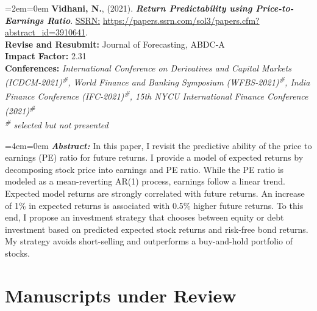 \documentclass[11pt,a4paper,]{moderncv}
\begin{document}
\begingroup
\setlength{\parindent}{-0.5in}
\setlength{\leftskip}{0.5in}

%
  \par%
  \medskip
  \leftskip=2em\rightskip=0em%
  \noindent\ignorespaces
\leavevmode\hypertarget{ref-pe}{}
\textbf{Vidhani, N.}, (2021). \textbf{\textit{Return Predictability using
Price-to-Earnings Ratio}}. \underline{SSRN:} \url{https://papers.ssrn.com/sol3/papers.cfm?abstract_id=3910641}.\\
\textbf{Revise and Resubmit:} Journal of Forecasting, ABDC-A\\
\textbf{Impact Factor:} 2.31\\
\textbf{Conferences:} \textit{International Conference on Derivatives and Capital Markets (ICDCM-2021)\textsuperscript{\#}, World Finance and Banking Symposium (WFBS-2021)\textsuperscript{\#}, India Finance Conference (IFC-2021)\textsuperscript{\#}, 15th NYCU International Finance Conference (2021)\textsuperscript{\#}}\\
\textit{\textsuperscript{\#} selected but not presented}
%
  \par\medskip

%
  \par%
  \medskip
  \leftskip=4em\rightskip=0em%
  \noindent\ignorespaces
\textbf{\textit{Abstract:}} In this paper, I revisit the predictive ability of the price to earnings (PE) ratio for future returns. I provide a model of expected returns by decomposing stock price into earnings and PE ratio. While the PE ratio is modeled as a mean-reverting AR(1) process, earnings follow a linear trend. Expected model returns are strongly correlated with future returns. An increase of 1\% in expected returns is associated with 0.5\% higher future returns. To this end, I propose an investment strategy that chooses between equity or debt investment based on predicted expected stock returns and risk-free bond returns. My strategy avoids short-selling and outperforms a buy-and-hold portfolio of stocks.
%
  \par\medskip

\endgroup

\hypertarget{manuscripts-under-review}{%
\section{Manuscripts under Review}\label{manuscripts-under-review}}

\begingroup
\setlength{\parindent}{-0.5in}
\setlength{\leftskip}{0.5in}
\end{document}
